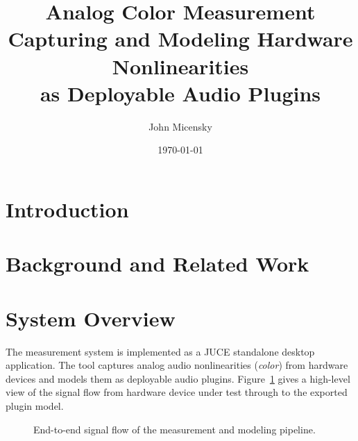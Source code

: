 \documentclass[11pt, letterpaper]{article}
\title{\textbf{Analog Color Measurement}\\[4pt]
       \large Capturing and Modeling Hardware Nonlinearities\\
       as Deployable Audio Plugins}
\author{John Micensky}
\date{\today}
\begin{document}
\maketitle
\tableofcontents
\newpage

\section{Introduction}
\label{sec:intro}

\section{Background and Related Work}
\label{sec:background}

\section{System Overview}
\label{sec:system}

The measurement system is implemented as a JUCE standalone desktop application.
The tool captures analog audio nonlinearities (\emph{color}) from hardware
devices and models them as deployable audio plugins.
Figure~\ref{fig:system_flow} gives a high-level view of the signal flow from
hardware device under test through to the exported plugin model.

\begin{figure}[H]
    \centering
    \caption{End-to-end signal flow of the measurement and modeling pipeline.}
    \label{fig:system_flow}
\end{figure}
\end{document}
